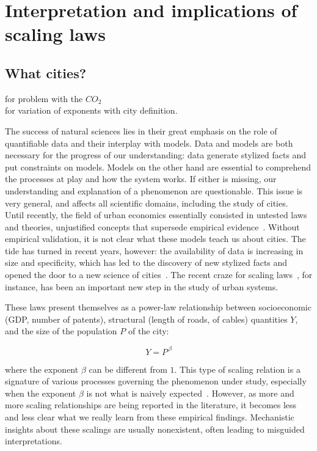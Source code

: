 \chapter{Interpretation and implications of scaling laws}
\label{chap:scaling_implications}

\bigskip


\section{What cities?}
\label{sec:what_cities_}

\cite{Louf:2014_smog} for problem with the $CO_2$\\
\cite{Arcaute:2014} for variation of exponents with city definition.


The success of natural sciences lies in their great emphasis on the role of
quantifiable data and their interplay with models. Data and models are both
necessary for the progress of our understanding: data generate stylized facts
and put constraints on models. Models on the other hand are essential to
comprehend the processes at play and how the system works. If either is missing,
our understanding and explanation of a phenomenon are questionable. This issue
is very general, and affects all scientific domains, including the study of
cities. \\

Until recently, the field of urban economics essentially consisted in untested
laws and theories, unjustified concepts that supersede empirical
evidence~\cite{Bouchaud:2008}. Without empirical validation, it is not clear
what these models teach us about cities. The tide has turned in recent years,
however: the availability of data is increasing in size and specificity, which
has led to the discovery of new stylized facts and opened the door to a new
science of cities~\cite{Batty:2013}. The recent craze for scaling
laws~\cite{Batty:2008,Bettencourt:2007,Pumain:2004}, for instance, has been an
important new step in the study of urban systems.

These laws present themselves as a power-law relationship between socioeconomic
(GDP, number of patents), structural (length of roads, of cables) quantities
$Y$, and the size of the population $P$ of the city:

\begin{equation}
Y = P^{\, \beta}
\end{equation}


where the exponent $\beta$ can be different from $1$. This type of scaling relation is a signature
of various processes governing the phenomenon under study, especially when the exponent
$\beta$ is not what is naively expected~\cite{Barenblatt:2003}. However, as more and more scaling
relationships are being reported in the literature, it becomes less and less clear what we really
learn from these empirical findings. Mechanistic insights about these scalings are usually
nonexistent, often leading to misguided interpretations.\\

